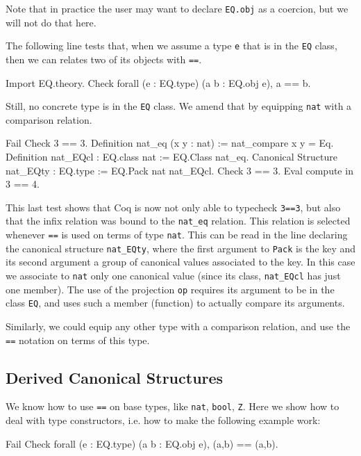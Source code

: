 Note that in practice the user may want to declare \texttt{EQ.obj} as a coercion,
but we will not do that here.

The following line tests that, when we assume a type \texttt{e} that is in the
\texttt{EQ} class, then we can relates two of its objects with \texttt{==}.

\begin{coq_example}
Import EQ.theory.
Check forall (e : EQ.type) (a b : EQ.obj e), a == b.
\end{coq_example}

Still, no concrete type is in the \texttt{EQ} class.  We amend that by equipping \texttt{nat}
with a comparison relation.

\begin{coq_example}
Fail Check 3 == 3.
Definition nat_eq (x y : nat) := nat_compare x y = Eq.
Definition nat_EQcl : EQ.class nat := EQ.Class nat_eq.
Canonical Structure nat_EQty : EQ.type := EQ.Pack nat nat_EQcl.
Check 3 == 3.
Eval compute in 3 == 4.
\end{coq_example}

This last test shows that Coq is now not only able to typecheck \texttt{3==3}, but
also that the infix relation was bound to the \texttt{nat\_eq} relation.  This
relation is selected whenever \texttt{==} is used on terms of type \texttt{nat}.  This
can be read in the line declaring the canonical structure \texttt{nat\_EQty},
where the first argument to \texttt{Pack} is the key and its second argument
a group of canonical values associated to the key.  In this case we associate
to \texttt{nat} only one canonical value (since its class, \texttt{nat\_EQcl} has just one
member).  The use of the projection \texttt{op} requires its argument to be in
the class \texttt{EQ}, and uses such a member (function) to actually compare
its arguments.

Similarly, we could equip any other type with a comparison relation, and
use the \texttt{==} notation on terms of this type.

\subsection{Derived Canonical Structures}

We know how to use \texttt{==} on base types, like \texttt{nat}, \texttt{bool}, \texttt{Z}.
Here we show how to deal with type constructors, i.e. how to make the
following example work:

\begin{coq_example}
Fail Check forall (e : EQ.type) (a b : EQ.obj e), (a,b) == (a,b).
\end{coq_example}

